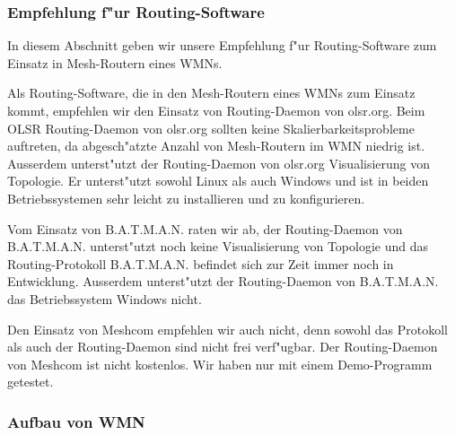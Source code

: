 \subsubsection{Empfehlung f"ur Routing-Software}

In diesem Abschnitt geben wir unsere Empfehlung f"ur Routing-Software
zum Einsatz in Mesh-Routern eines WMNs.

Als Routing-Software, die in den Mesh-Routern eines WMNs zum Einsatz kommt,
empfehlen wir den Einsatz von Routing-Daemon von olsr.org. Beim OLSR
Routing-Daemon von olsr.org sollten keine Skalierbarkeitsprobleme auftreten,
da abgesch"atzte Anzahl von Mesh-Routern im WMN niedrig ist. Ausserdem
unterst"utzt der Routing-Daemon von olsr.org Visualisierung von Topologie.
Er unterst"utzt sowohl Linux als auch Windows und ist in beiden
Betriebssystemen sehr leicht zu installieren und zu konfigurieren.

Vom Einsatz von B.A.T.M.A.N. raten wir ab, der Routing-Daemon von
B.A.T.M.A.N. unterst"utzt noch keine Visualisierung von Topologie
und das Routing-Protokoll B.A.T.M.A.N.  befindet sich zur Zeit immer
noch in Entwicklung.  Ausserdem unterst"utzt der Routing-Daemon von
B.A.T.M.A.N. das Betriebssystem Windows nicht.

Den Einsatz von Meshcom empfehlen wir auch nicht, denn sowohl das
Protokoll als auch der Routing-Daemon sind nicht frei verf"ugbar.
Der Routing-Daemon von Meshcom ist nicht kostenlos. Wir haben nur mit
einem Demo-Programm getestet.

\subsubsection{Aufbau von WMN}
\label{sec:Aufbau}

